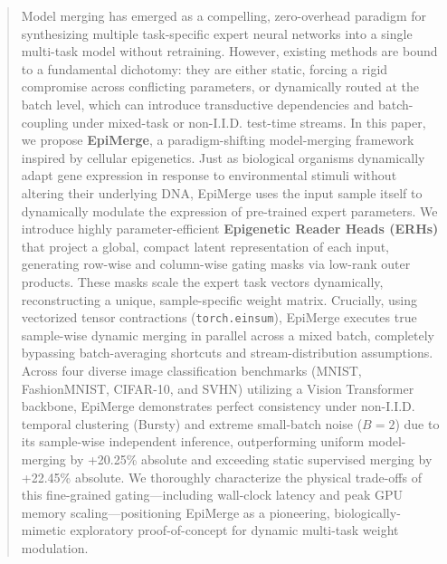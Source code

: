 \begin{abstract}
Model merging has emerged as a compelling, zero-overhead paradigm for synthesizing multiple task-specific expert neural networks into a single multi-task model without retraining.
However, existing methods are bound to a fundamental dichotomy: they are either static, forcing a rigid compromise across conflicting parameters, or dynamically routed at the batch level, which can introduce transductive dependencies and batch-coupling under mixed-task or non-I.I.D. test-time streams.
In this paper, we propose \textbf{EpiMerge}, a paradigm-shifting model-merging framework inspired by cellular epigenetics.
Just as biological organisms dynamically adapt gene expression in response to environmental stimuli without altering their underlying DNA, EpiMerge uses the input sample itself to dynamically modulate the expression of pre-trained expert parameters.
We introduce highly parameter-efficient \textbf{Epigenetic Reader Heads (ERHs)} that project a global, compact latent representation of each input, generating row-wise and column-wise gating masks via low-rank outer products.
These masks scale the expert task vectors dynamically, reconstructing a unique, sample-specific weight matrix.
Crucially, using vectorized tensor contractions (\texttt{torch.einsum}), EpiMerge executes true sample-wise dynamic merging in parallel across a mixed batch, completely bypassing batch-averaging shortcuts and stream-distribution assumptions.
Across four diverse image classification benchmarks (MNIST, FashionMNIST, CIFAR-10, and SVHN) utilizing a Vision Transformer backbone, EpiMerge demonstrates perfect consistency under non-I.I.D. temporal clustering (Bursty) and extreme small-batch noise ($B=2$) due to its sample-wise independent inference, outperforming uniform model-merging by +20.25\% absolute and exceeding static supervised merging by +22.45\% absolute. We thoroughly characterize the physical trade-offs of this fine-grained gating---including wall-clock latency and peak GPU memory scaling---positioning EpiMerge as a pioneering, biologically-mimetic exploratory proof-of-concept for dynamic multi-task weight modulation.
\end{abstract}
